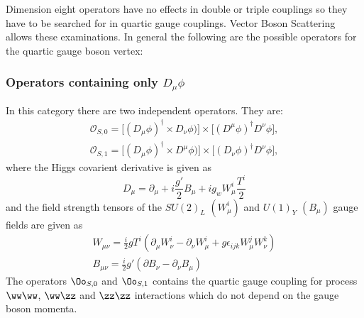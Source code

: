 Dimension eight operators have no effects in double or triple couplings so they have to be searched for in quartic gauge couplings. Vector Boson Scattering allows these examinations. In general the following are the possible operators for the quartic gauge boson vertex:

\subsubsection{Operators containing only $D_\mu \phi$} %
\label{ssub:operators_containing_only_}
In this category there are two independent operators. They are:
\begin{eqnarray}
    \mathcal{O}_{S,0}=\Big[(D_{\mu}\phi)^{\dagger}\times D_{\nu}\phi) \Big]\times \Big[(D^{\mu}\phi)^{\dagger}D^{\nu}\phi \Big], \\
    \mathcal{O}_{S,1}=\Big[(D_{\mu}\phi)^{\dagger}\times D^{\mu}\phi)\Big]\times \Big[(D_{\nu}\phi)^{\dagger} D^{\nu}\phi\Big],
\end{eqnarray}
where the Higgs covarient derivative is given as
\begin{equation}\label{eq:covarient_derivative_qgc}
     D_\mu = \partial_\mu + i\frac{g'}{2}B_\mu + ig_w W^i_{\mu} \frac{T^i}{2}
 \end{equation} 
 and the field strength tensors of the $SU(2)_L$ $(W^i_\mu)$ and $U(1)_Y$  $(B_\mu)$ gauge fields are given as
\begin{eqnarray}\label{eq:fieldstrength_qgc}
    W_{\mu \nu} = \frac{i}{2}g T^i (\partial_\mu W^i_\nu - \partial_\nu W^i_\mu + g \epsilon_{ijk} W^j_\mu W^k_\nu) \\
    B_{\mu \nu} = \frac{i}{2} g' (\partial B_\nu - \partial_\nu B_\mu)
\end{eqnarray}
The operators $\Oo_{S,0}$ and $\Oo_{S,1}$ contains the quartic gauge coupling for process $\ww \ww$, $\ww \zz$ and $\zz \zz$ interactions which do not depend on the gauge boson momenta. 

